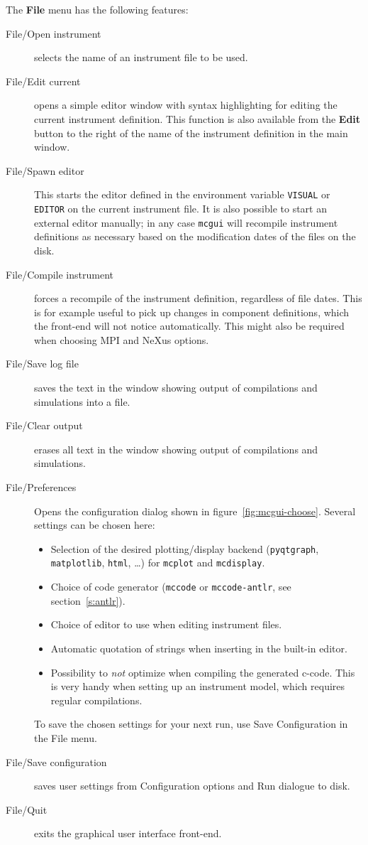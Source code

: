 The \textbf{File} menu has the following features:
\begin{description}
\item[File/Open instrument] selects the name of an instrument file to be used.
\item[File/Edit current] opens a simple editor window with \MCS syntax
  highlighting for editing the
  current instrument definition. This function is also available from
  the \textbf{Edit} button to the right of the name of the instrument definition in
  the main window.
\item[File/Spawn editor] This starts the editor defined in the environment
  variable \verb+VISUAL+ or \verb+EDITOR+ on the current instrument
  file. It is also possible to start an external editor manually; in any
  case \verb+mcgui+ will recompile instrument definitions as necessary based on
  the modification dates of the files on the disk.
\item[File/Compile instrument] forces a recompile of the instrument definition,
  regardless of file dates. This is for example useful to pick up changes in
  component definitions, which the front-end will not notice automatically. This
  might also be required when choosing MPI  and NeXus options.
\item[File/Save log file] saves the text in the window showing output of
  compilations and simulations into a file.
\item[File/Clear output] erases all text in the window showing output of
  compilations and simulations.
  \item[File/Preferences] Opens the configuration dialog shown in
  figure~\ref{fig:mcgui-choose}. Several settings can be chosen here:
\begin{itemize}
  \item Selection of the desired plotting/display backend (\texttt{pyqtgraph},
    \texttt{matplotlib}, \texttt{html}, \ldots) for \texttt{mcplot} and
    \texttt{mcdisplay}.
  \item Choice of code generator (\texttt{mccode} or \texttt{mccode-antlr},
    see section~\ref{s:antlr}).
  \item Choice of editor to use when editing instrument files.
  \item Automatic quotation of strings when inserting in the built-in
    editor.
  \item Possibility to \emph{not} optimize when compiling the generated
    c-code. This is very handy when setting up an instrument model, which
    requires regular compilations.
\end{itemize}
To save the chosen settings for your next \MCS run, use Save
Configuration in the File menu.
\item[File/Save configuration] saves user settings from Configuration
  options and Run dialogue to disk.
\item[File/Quit] exits the graphical user interface front-end.
\end{description}

